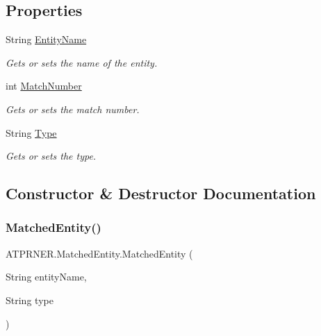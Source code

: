 \subsection*{Properties}
\begin{DoxyCompactItemize}
\item 
String \hyperlink{class_a_t_p_r_n_e_r_1_1_matched_entity_a42a05257a07b5d089ac070b1d9e5461a}{Entity\+Name}
\begin{DoxyCompactList}\small\item\em Gets or sets the name of the entity. \end{DoxyCompactList}\item 
int \hyperlink{class_a_t_p_r_n_e_r_1_1_matched_entity_ad6ca936e2b54158984f7d7d3753d1490}{Match\+Number}
\begin{DoxyCompactList}\small\item\em Gets or sets the match number. \end{DoxyCompactList}\item 
String \hyperlink{class_a_t_p_r_n_e_r_1_1_matched_entity_af7d651ec944931f14c26eedffc4150de}{Type}
\begin{DoxyCompactList}\small\item\em Gets or sets the type. \end{DoxyCompactList}\end{DoxyCompactItemize}


\subsection{Constructor \& Destructor Documentation}
\hypertarget{class_a_t_p_r_n_e_r_1_1_matched_entity_a5737ccd3008395ca92559e0b1b1f3e73}{}\label{class_a_t_p_r_n_e_r_1_1_matched_entity_a5737ccd3008395ca92559e0b1b1f3e73} 
\subsubsection{\texorpdfstring{Matched\+Entity()}{MatchedEntity()}}
{\footnotesize\ttfamily A\+T\+P\+R\+N\+E\+R.\+Matched\+Entity.\+Matched\+Entity (\begin{DoxyParamCaption}\item[{String}]{entity\+Name,  }\item[{String}]{type }\end{DoxyParamCaption})\hspace{0.3cm}{\ttfamily [inline]}}



